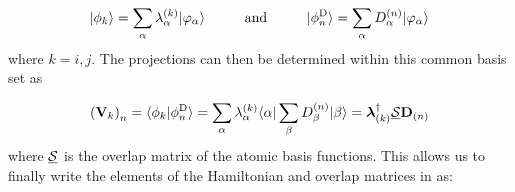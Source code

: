 \begin{equation}
  {\ensuremath{\vert \phi_{k} \rangle}} = \sum_{\alpha} \lambda^{(k)}_\alpha {\ensuremath{\vert \varphi_\alpha \rangle}} 
\hspace{1cm}\text{and}\hspace{1cm}
  {\ensuremath{\vert \phi^\text{D}_n \rangle}} = \sum_{\alpha} D^{(n)}_\alpha {\ensuremath{\vert \varphi_\alpha \rangle}}
  \label{eq:dipro_eq18}
\end{equation}
%
where $k=i,j$. The projections can then be determined within this common basis 
set as

 \begin{equation}
  \begin{aligned}
     \left({\mathbf{V}}_k\right)_n={\langle \phi_k \vert \phi^\text{D}_n \rangle} = \sum_{\alpha} 
\lambda^{(k)}_{\alpha} {\langle \alpha \vert} \sum_{\beta} D^{(n)}_{\beta} {\vert \beta \rangle} = 
     {\mathbf{\boldsymbol{\lambda}}}_{(k)}^\dagger \underline{\mathbf{\mathcal{S}}} 
{\mathbf{D}}_{(n)} 
  \end{aligned}
   \label{eq:dipro_eq19}
 \end{equation}
where $\underline{\mathbf{\mathcal{S}}}$ is the overlap matrix of the atomic basis functions. 
This allows us to finally write the elements of the Hamiltonian and overlap 
matrices in  as:

